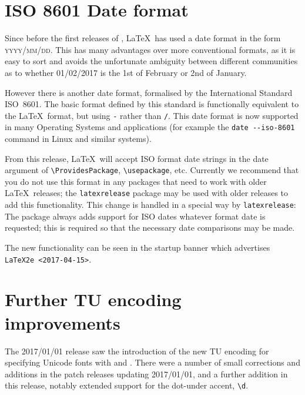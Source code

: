 \documentclass{ltnews}
\providecommand\pkg[1]{\texttt{#1}}
\begin{document}
\maketitle
\tableofcontents

\setlength{}

\section{ISO 8601 Date format}
Since before the first releases of \LaTeXe, \LaTeX\ has used a date
format in the form \textsc{yyyy/mm/dd}. This has many advantages over more
conventional formats, as it is easy to sort and avoids the unfortunate
ambiguity between different communities as to whether 01/02/2017 is the
1st of February or 2nd of January.

However there is another date format, formalised by the
International Standard ISO~8601. The basic format defined by this
standard is functionally equivalent to the \LaTeX\ format, but using
\texttt{-} rather than \texttt{/}. This date format is now supported
in many Operating Systems and applications
(for example the \verb|date --iso-8601| command in Linux and similar systems).

From this release, \LaTeX\ will accept ISO format date strings in the
date argument of \verb|\ProvidesPackage|, \verb|\usepackage|, etc.
Currently we recommend that you do not use this format in any packages
that need to work with older \LaTeX\ releases;
the \pkg{latexrelease} package may be used with older releases to
 add this functionality. This change is handled in a special way  by
 \pkg{latexrelease}: The package always adds support for ISO dates
whatever format date is requested; this is required so that the
necessary date comparisons may be made.

The new functionality can be seen in the startup banner which
advertises \texttt{LaTeX2e <2017-04-15>}.

\section{Further TU encoding improvements}
The 2017/01/01 release saw the introduction of the new TU encoding for
specifying Unicode fonts with  and
. There were a number of small corrections and additions
in the patch releases updating 2017/01/01, and a further addition in
this release, notably extended support for the dot-under accent,
\verb|\d|.
\end{document}
